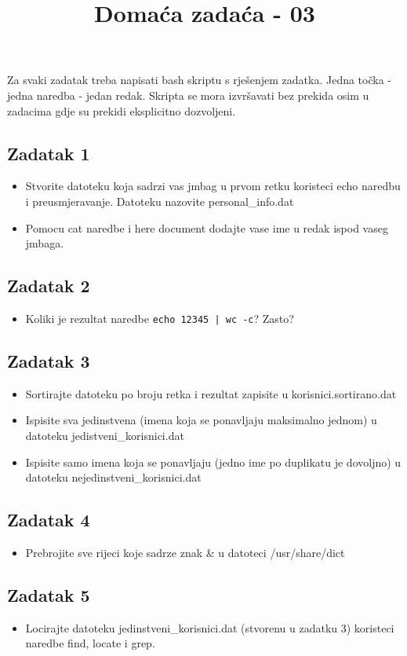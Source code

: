 \documentclass[12pt,a4paper]{article}
\newcommand{\shell}[1]{\texttt{#1}}
\begin{document}
  \title{Domaća zadaća - 03\vspace{-2em}}
  \maketitle
  Za svaki zadatak treba napisati bash skriptu s rješenjem zadatka. Jedna točka - jedna naredba - jedan redak. Skripta se mora izvršavati bez prekida osim u zadacima gdje su prekidi eksplicitno dozvoljeni.
  \subsection*{Zadatak 1}
  \begin{itemize}
    \item Stvorite datoteku koja sadrzi vas jmbag u prvom retku koristeci echo naredbu i preusmjeravanje. Datoteku nazovite personal_info.dat
    \item Pomocu cat naredbe i here document dodajte vase ime u redak ispod vaseg jmbaga.
  \end{itemize}
  \subsection*{Zadatak 2}
  \begin{itemize}
    \item Koliki je rezultat naredbe \shell{echo 12345 | wc -c}? Zasto?
  \end{itemize}
  \subsection*{Zadatak 3}
  \begin{itemize}
      Napomena: Za sve tocke ovog zadatka iskoristite datoteku: korisnici.dat. Datoteke koje nastaju kao proizvod 1. zadatka nije potrebno stavljati u git.
      Svaki redak u datoteci prvi.dat ima format <broj retka>:<ime>:<id korisnika>
    \item Sortirajte datoteku po broju retka i rezultat zapisite u korisnici.sortirano.dat
    \item Ispisite sva jedinstvena (imena koja se ponavljaju maksimalno jednom) u datoteku jedistveni_korisnici.dat
    \item Ispisite samo imena koja se ponavljaju (jedno ime po duplikatu je dovoljno) u datoteku nejedinstveni_korisnici.dat
  \end{itemize}
  \subsection*{Zadatak 4}
  \begin{itemize}
    \item Prebrojite sve rijeci koje sadrze znak \&  u datoteci /usr/share/dict
  \end{itemize}
  \subsection*{Zadatak 5}
  \begin{itemize}
    \item Locirajte datoteku jedinstveni_korisnici.dat (stvorenu u zadatku 3) koristeci naredbe find, locate i grep.   
  \end{itemize}
\end{document}
